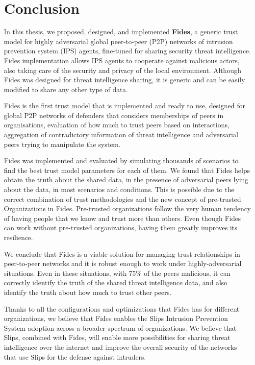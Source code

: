 \chapter{Conclusion}
\label{ch:conclusion}

In this thesis, we proposed, designed, and implemented \textbf{Fides}, a generic trust model for highly adversarial global peer-to-peer (P2P) networks of intrusion prevention system (IPS) agents, fine-tuned for sharing security threat intelligence. Fides implementation allows IPS agents to cooperate against malicious actors, also taking care of the security and privacy of the local environment. 
Although Fides was designed for threat intelligence sharing, it is generic and can be easily modified to share any other type of data. 

Fides is the first trust model that is implemented and ready to use, designed for global P2P networks of defenders that considers memberships of peers in organisations, evaluation of how much to trust peers based on interactions, aggregation of contradictory information of threat intelligence and adversarial peers trying to manipulate the system.

Fides was implemented and evaluated by simulating thousands of scenarios to find the best trust model parameters for each of them. We found that Fides helps obtain the truth about the shared data, in the presence of adversarial peers lying about the data, in most scenarios and conditions. This is possible due to the correct combination of trust methodologies and the new concept of pre-trusted Organizations in Fides. Pre-trusted organizations follow the very human tendency of having people that we know and trust more than others. Even though Fides can work without pre-trusted organizations, having them greatly improves its resilience.

We conclude that Fides is a viable solution for managing trust relationships in peer-to-peer networks and it is robust enough to work under highly-adversarial situations. Even in these situations, with 75\% of the peers malicious, it can correctly identify the truth of the shared threat intelligence data, and also identify the truth about how much to trust other peers.

Thanks to all the configurations and optimizations that Fides has for different organizations, we believe that Fides enables the Slips Intrusion Prevention System adoption across a broader spectrum of organizations.
We believe that Slips, combined with Fides, will enable more possibilities for sharing threat intelligence over the internet and improve the overall security of the networks that use Slips for the defense against intruders.


